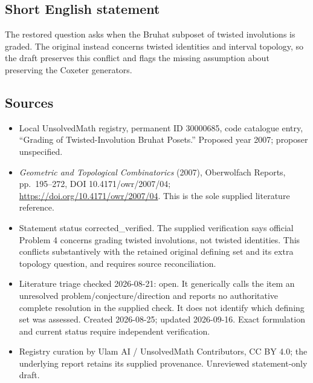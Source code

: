 \documentclass[11pt]{article}
\begin{document}
\subsection{Short English statement}
The restored question asks when the Bruhat subposet of twisted involutions is graded. The original instead concerns twisted identities and interval topology, so the draft preserves this conflict and flags the missing assumption about preserving the Coxeter generators.
\subsection{Sources}
\begin{itemize}
\item Local UnsolvedMath registry, permanent ID 30000685, code catalogue entry, ``Grading of Twisted-Involution Bruhat Posets.'' Proposed year 2007; proposer unspecified.
\item \emph{Geometric and Topological Combinatorics} (2007), Oberwolfach Reports, pp.\ 195--272, DOI 10.4171/owr/2007/04; \url{https://doi.org/10.4171/owr/2007/04}. This is the sole supplied literature reference.
\item Statement status corrected\_verified. The supplied verification says official Problem 4 concerns grading twisted involutions, not twisted identities. This conflicts substantively with the retained original defining set and its extra topology question, and requires source reconciliation.
\item Literature triage checked 2026-08-21: open. It generically calls the item an unresolved problem/conjecture/direction and reports no authoritative complete resolution in the supplied check. It does not identify which defining set was assessed. Created 2026-08-25; updated 2026-09-16. Exact formulation and current status require independent verification.
\item Registry curation by Ulam AI / UnsolvedMath Contributors, CC BY 4.0; the underlying report retains its supplied provenance. Unreviewed statement-only draft.
\end{itemize}
\end{document}
